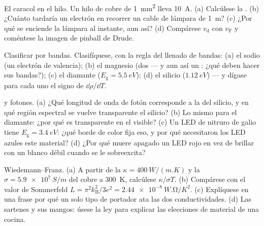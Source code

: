 \begin{exercise}[$\star$]\label{exo:b3:electrons-in-solids:2}
El caracol en el hilo. Un hilo de cobre de \qty{1}{mm^2} lleva
\qty{10}{A}. (a) Calcúlese la . (b) ¿Cuánto tardaría
un electrón en recorrer un cable de lámpara de \qty{1}{m}? (c) ¿Por qué se enciende
la lámpara al instante, aun así? (d) Compárese
$v_{\text{d}}$ con $v_{\text{F}}$ y coméntese la imagen de pinball
de Drude.
\end{exercise}

\begin{exercise}[$\star$]\label{exo:b3:electrons-in-solids:3}
Clasificar por bandas. Clasifíquese, con la regla del llenado de bandas: (a)
el sodio (un electrón de valencia); (b) el magnesio (dos --- y aun así un
: ¿qué deben hacer sus bandas?); (c) el diamante
($E_{\text{g}} = \qty{5.5}{eV}$); (d) el silicio
($\qty{1.12}{eV}$) --- y dígase para cada uno el signo de
$\dd\rho/\dd T$.
\end{exercise}

\begin{exercise}[$\star$]\label{exo:b3:electrons-in-solids:4}
 y fotones. (a) ¿Qué longitud de onda de fotón corresponde a la  del silicio, y en qué región espectral se vuelve transparente el
silicio? (b) Lo mismo para el diamante: ¿por qué es transparente en el
visible? (c) Un LED de nitruro de galio tiene $E_{\text{g}} =
\qty{3.4}{eV}$: ¿qué borde de color fija eso, y por qué necesitaron los LED
azules este material? (d) ¿Por qué muere apagado un LED rojo en vez
de brillar con un blanco débil cuando se le sobreexcita?
\end{exercise}

\begin{exercise}[$\star\star$]\label{exo:b3:electrons-in-solids:5}
Wiedemann--Franz. (a) A partir de la $\kappa =
\qty{400}{W/(m.K)}$ y la $\sigma = \qty{5.9e7}{S/m}$ del cobre a
\qty{300}{K}, calcúlese $\kappa/\sigma T$. (b) Compárese con el
valor de Sommerfeld $L = \pi^2k_{\text{B}}^2/3e^2 =
\qty{2.44e-8}{W.\ohm/K^2}$. (c) Explíquese en una frase por qué un
solo tipo de portador ata las dos conductividades. (d) Las sartenes
y sus mangos: úsese la ley para explicar las elecciones de material de una
cocina.
\end{exercise}


